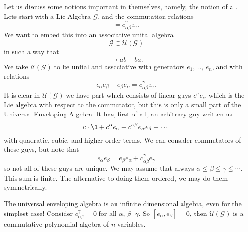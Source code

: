 Let us discuss some notions important in themselves, namely, the
notion of a . Lets start
with a Lie Algebra $\mathscr{G}$, and the commutation relations
\begin{equation}
[e_{\alpha}, e_{\beta}] = c^{\gamma}_{\alpha\beta}e_{\gamma}.
\end{equation}
We want to embed this into an associative unital algebra
\begin{equation}
\mathscr{G}\subset\mathcal{U}(\mathscr{G})
\end{equation}
in such a way that
\begin{equation}
[a,b] \mapsto ab-ba.
\end{equation}
We take $\mathcal{U}(\mathscr{G})$ to be unital and associative
with generators $e_{1}$, \dots, $e_{n}$, and with relations
\begin{equation}
e_{\alpha}e_{\beta}-e_{\beta}e_{\alpha}=c^{\gamma}_{\alpha\beta}e_{\gamma}.
\end{equation}
It is clear in $\mathcal{U}(\mathscr{G})$ we have part which
consists of linear guys $c^{\alpha}e_{\alpha}$ which is the Lie
algebra with respect to the commutator, but this is only a small
part of the Universal Enveloping Algebra. It has, first of all,
an arbitrary guy written as
\begin{equation}
c\cdot\1 + c^{\alpha}e_{\alpha} +
c^{\alpha\beta}e_{\alpha}e_{\beta} + \cdots
\end{equation}
with quadratic, cubic, and higher order terms. We can consider
commutators of these guys, but note that
\begin{equation}
e_{\alpha}e_{\beta} = e_{\beta}e_{\alpha}+c^{\gamma}_{\alpha\beta}e_{\gamma}
\end{equation}
so not all of these guys are unique. We may assume that always
$\alpha\leq\beta\leq\gamma\leq\cdots$. This sum is finite. The
alternative to doing them ordered, we may do them symmetrically.

\begin{rmk}
The universal enveloping algebra is an infinite dimensional
algebra, even for the simplest case! Consider
$c^{\gamma}_{\alpha\beta}=0$ for all $\alpha$, $\beta$,
$\gamma$. So $[e_{\alpha},e_{\beta}]=0$, then
$\mathcal{U}(\mathscr{G})$ is a commutative polynomial algebra of
$n$-variables. 
\end{rmk}

